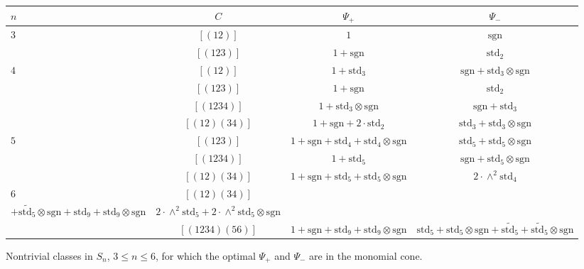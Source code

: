 \documentclass[12pt]{amsart}
\theoremstyle{definition} \newtheorem{definition}[theorem]{Definition}
\theoremstyle{example} \newtheorem{example}[theorem]{Example}
\theoremstyle{remark} \newtheorem{remark}{Remark}[theorem]
\numberwithin{equation}{section}
\numberwithin{theorem}{section}
\renewcommand{\leq}{\leqslant}
\begin{document}
	{\tiny
	\begin{table}[h]
		\begin{tabular}{|l|c|c|c|} \hline
			$n$ & $C$ & $\Psi_+$ & $\Psi_-$  \\ \hline \hline
				$3$ 
					& $[(12)]$ & {\tiny $1$} & {\tiny $\mathrm{sgn}$} \\ \hline
					& $[(123)]$ & {\tiny $1+\mathrm{sgn}$} & {\tiny $\mathrm{std}_2$} \\ \hline \hline
				$4$ 
					& $[(12)]$ & {\tiny $1+\mathrm{std}_3$} & {\tiny $\mathrm{sgn} + \mathrm{std}_3\otimes \mathrm{sgn}$} \\ \hline
					& $[(123)]$ & {\tiny $1+\mathrm{sgn}$} & {\tiny $\mathrm{std}_2$} \\ \hline
					& $[(1234)]$ & {\tiny $1+\mathrm{std}_3\otimes \mathrm{sgn}$} & {\tiny $\mathrm{sgn} + \mathrm{std}_3$} \\ \hline
					& $[(12)(34)]$ & {\tiny $1 + \mathrm{sgn} + 2\cdot \mathrm{std}_2$} & {\tiny $\mathrm{std}_3+\mathrm{std}_3 \otimes \mathrm{sgn}$} \\ \hline\hline
				$5$ 
					& $[(123)]$ & {\tiny $1 + \mathrm{sgn} + \mathrm{std}_4 + \mathrm{std}_4\otimes \mathrm{sgn}$} & {\tiny$ \mathrm{std}_5 + \mathrm{std}_5\otimes \mathrm{sgn}$} \\ \hline
					& $[(1234)]$ & {\tiny$1 + \mathrm{std}_5$} & {\tiny $\mathrm{sgn} + \mathrm{std}_5\otimes \mathrm{sgn}$}  \\ \hline
					& $[(12)(34)]$ & {\tiny $1 + \mathrm{sgn} + \mathrm{std}_5 + \mathrm{std}_5 \otimes \mathrm{sgn}$} & {\tiny $2 \cdot \wedge^2 \mathrm{std}_4$} \\ \hline \hline
				$6$
					& $[(12)(34)]$ & {\tiny \makecell[t]{$1 + \mathrm{sgn} + \mathrm{std}_5 + \mathrm{std}_5\otimes \mathrm{sgn} + \widetilde{\mathrm{std}_5}$ \\ $ + \widetilde{\mathrm{std}_5} \otimes \mathrm{sgn} + \mathrm{std}_9 + \mathrm{std}_9 \otimes \mathrm{sgn}$}} & {\tiny $2\cdot \wedge^2 \mathrm{std}_5 + 2\cdot \wedge^2 \mathrm{std}_5 \otimes \mathrm{sgn}$} \\ \hline
					& $[(1234)(56)]$ & {\tiny $1 + \mathrm{sgn} + \mathrm{std}_9 + \mathrm{std}_9 \otimes \mathrm{sgn}$} & {\tiny $\mathrm{std}_5+\mathrm{std}_5\otimes\mathrm{sgn} + \widetilde{\mathrm{std}_5}+\widetilde{\mathrm{std}_5}\otimes\mathrm{sgn}$} \\ \hline
				
		\end{tabular}
		\begin{caption}{\label{tbl:monomial-cone} Nontrivial classes in $S_n$, $3 \leq n \leq 6$, for which the optimal $\Psi_+$ and $\Psi_-$ are in the monomial cone.}
		\end{caption}
	\end{table}}
	
\end{document}
